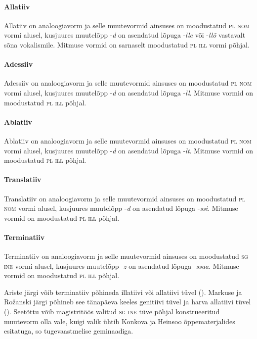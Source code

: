 \documentclass[12pt,a4paper]{article}
\newcommand{\msd}[1]{\textsc{#1}}
\begin{document}
\paragraph*{Allatiiv}
Allatiiv on analoogiavorm ja selle muutevormid ainsuses on moodustatud \msd{pl nom} vormi alusel, kusjuures muutelõpp -\textit{d} on asendatud lõpuga -\textit{lle} või -\textit{llõ} vastavalt sõna vokalismile. Mitmuse vormid on sarnaselt moodustatud \msd{pl ill} vormi põhjal.


\paragraph*{Adessiiv}
Adessiiv on analoogiavorm ja selle muutevormid ainsuses on moodustatud \msd{pl nom} vormi alusel, kusjuures muutelõpp -\textit{d} on asendatud lõpuga -\textit{ll}. Mitmuse vormid on moodustatud \msd{pl ill} põhjal.


\paragraph*{Ablatiiv}
Ablatiiv on analoogiavorm ja selle muutevormid ainsuses on moodustatud \msd{pl nom} vormi alusel, kusjuures muutelõpp -\textit{d} on asendatud lõpuga -\textit{lt}. Mitmuse vormid on moodustatud \msd{pl ill} põhjal.


\paragraph*{Translatiiv}
Translatiiv on analoogiavorm ja selle muutevormid ainsuses on moodustatud \msd{pl nom} vormi alusel, kusjuures muutelõpp -\textit{d} on asendatud lõpuga -\textit{ssi}. Mitmuse vormid on moodustatud \msd{pl ill} põhjal.


\paragraph*{Terminatiiv}
Terminatiiv on analoogiavorm ja selle muutevormid ainsuses on moodustatud \msd{sg ine} vormi alusel, kusjuures muutelõpp -\textit{z} on asendatud lõpuga -\textit{ssaa}. Mitmuse vormid on moodustatud \msd{pl ill} põhjal.

Ariste järgi võib terminatiiv põhineda illatiivi või allatiivi tüvel (\cite[34]{ariste_grammar_1968}). Markuse ja Rožanski järgi põhineb see tänapäeva keeles genitiivi tüvel ja harva allatiivi tüvel (\cite[247]{markus_comitative_2014}). Seetõttu võib magistritöös valitud \msd{sg ine} tüve põhjal konstrueeritud muutevorm olla vale, kuigi valik ühtib Konkova ja Heinsoo õppe\-materjalides esitatuga, so tugeva\-astmelise geminaadiga.
\end{document}
